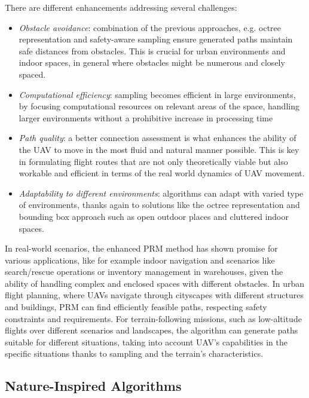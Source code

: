 \documentclass[conference]{IEEEtran}
\begin{document}
There are different enhancements addressing several challenges:
\begin{itemize}
    \item \textit{Obstacle avoidance}: combination of the previous approaches, e.g. octree representation and safety-aware sampling ensure generated paths maintain safe distances from obstacles. This is crucial for urban environments and indoor spaces, in general where obstacles might be numerous and closely spaced.
    \item \textit{Computational efficiency}: sampling becomes efficient in large environments, by focusing computational resources on relevant areas of the space, handling larger environments without a prohibitive increase in processing time 
    \item \textit{Path quality}: a better connection assessment is what enhances the ability of the UAV to move in the most fluid and natural manner possible. This is key in formulating flight routes that are not only theoretically viable but also workable and efficient in terms of the real world dynamics of UAV movement.
    \item \textit{Adaptability to different environments}: algorithms can adapt with varied type of environments, thanks again to solutions like the octree representation and bounding box approach such as open outdoor places and cluttered indoor spaces.
\end{itemize}

In real-world scenarios, the enhanced PRM method has shown promise for various applications, like for example indoor navigation and scenarios like search/rescue operations or inventory management in warehouses, given the ability of handling complex and enclosed spaces with different obstacles. In urban flight planning, where UAVs navigate through cityscapes with different structures and buildings, PRM can find efficiently feasible paths, respecting safety constraints and requirements. For terrain-following missions, such as low-altitude flights over different scenarios and landscapes, the algorithm can generate paths suitable for different situations, taking into account UAV's capabilities in the specific situations thanks to sampling and the terrain's characteristics. \\

\subsection{Nature-Inspired Algorithms}
\end{document}

